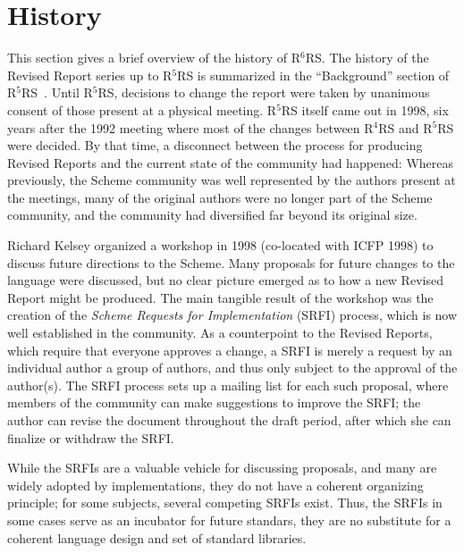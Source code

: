 \documentclass{sigplanconf}
\newcommand{\rn}[1]{R$^{#1}$RS}
\begin{document}
\section{History}
\label{sec:history}

This section gives a brief overview of the history of \rn{6}.
The history of the Revised Report series up to \rn{5} is summarized in
the ``Background'' section of \rn{5}~\cite{R5RS}.  Until \rn{5},
decisions to change the report were taken by unanimous consent of
those present at a physical meeting.  \rn{5} itself came out in 1998,
six years after the 1992 meeting where most of the changes between
\rn{4} and \rn{5} were decided.  By that time, a disconnect between
the process for producing Revised Reports and the current state of the
community had happened: Whereas previously, the Scheme community was
well represented by the authors present at the meetings, many of the
original authors were no longer part of the Scheme community, and the
community had diversified far beyond its original size.

Richard Kelsey organized a workshop in 1998 (co-located with ICFP
1998) to discuss future directions to the Scheme.  Many proposals for
future changes to the language were discussed, but no clear picture
emerged as to how a new Revised Report might be produced. The main
tangible result of the workshop was the creation of the \textit{Scheme
  Requests for Implementation} (SRFI) process, which is now well
established in the community.  As a counterpoint to the Revised
Reports, which require that everyone approves a change, a SRFI is
merely a request by an individual author a group of authors, and thus
only subject to the approval of the author(s).  The SRFI process sets up
a mailing list for each such proposal, where members of the community
can make suggestions to improve the SRFI; the author can revise the
document throughout the draft period, after which she can finalize or
withdraw the SRFI.

While the SRFIs are a valuable vehicle for discussing proposals, and
many are widely adopted by implementations, they do not have a
coherent organizing principle; for some subjects, several competing
SRFIs exist.  Thus, the SRFIs in some cases serve as an incubator for
future standars, they are no substitute for a coherent language design
and set of standard libraries.
\end{document}
